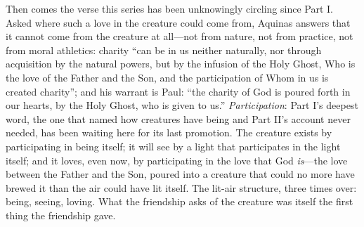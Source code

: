Then comes the verse this series has been unknowingly circling since Part I. Asked where such a love in the creature could come from, Aquinas answers that it cannot come from the creature at all---not from nature, not from practice, not from moral athletics: charity ``can be in us neither naturally, nor through acquisition by the natural powers, but by the infusion of the Holy Ghost, Who is the love of the Father and the Son, and the participation of Whom in us is created charity''; and his warrant is Paul: ``the charity of God is poured forth in our hearts, by the Holy Ghost, who is given to us.'' \emph{Participation}: Part I's deepest word, the one that named how creatures have being and Part II's account never needed, has been waiting here for its last promotion. The creature exists by participating in being itself; it will see by a light that participates in the light itself; and it loves, even now, by participating in the love that God \emph{is}---the love between the Father and the Son, poured into a creature that could no more have brewed it than the air could have lit itself. The lit-air structure, three times over: being, seeing, loving. What the friendship asks of the creature was itself the first thing the friendship gave.

